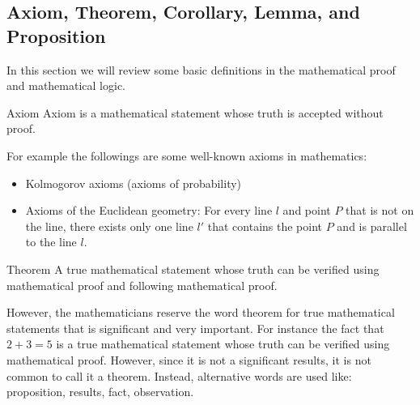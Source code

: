 	


\subsection{Axiom, Theorem, Corollary, Lemma, and Proposition }

In this section we will review some basic definitions in the mathematical proof and mathematical logic.

\begin{defbox}{Axiom}
	Axiom is a mathematical statement whose truth is accepted without proof.
\end{defbox}

For example the followings are some well-known axioms in mathematics:

\begin{itemize}
	\item Kolmogorov axioms (axioms of probability)
	\item Axioms of the Euclidean geometry: For every line $l$ and point $P$ that is not on the line, there exists only one line $l'$ that contains the point $P$ and is parallel to the line $l$.
\end{itemize}

\begin{defbox}{Theorem}
	A true mathematical statement whose truth can be verified using mathematical proof and following mathematical proof.
\end{defbox}

However, the mathematicians reserve the word theorem for true mathematical statements that is significant and very important. For instance the fact that $2 + 3 = 5$ is a true mathematical statement whose truth can be verified using mathematical proof. However, since it is not a significant results, it is not common to call it a theorem. Instead, alternative words are used like: proposition, results, fact, observation.  
